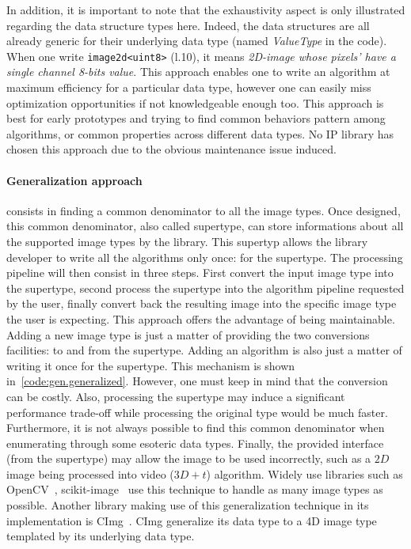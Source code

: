 In addition, it is important to note that the exhaustivity aspect is only illustrated regarding the data structure types
here. Indeed, the data structures are all already generic for their underlying data type (named \emph{ValueType} in the
code). When one write \texttt{image2d<uint8>} (l.10), it means \emph{2D-image whose pixels' have a single channel 8-bits
  value}. This approach enables one to write an algorithm at maximum efficiency for a particular data type, however one
can easily miss optimization opportunities if not knowledgeable enough too. This approach is best for early prototypes
and trying to find common behaviors pattern among algorithms, or common properties across different data types. No IP
library has chosen this approach due to the obvious maintenance issue induced.

\paragraph{Generalization approach} consists in finding a common denominator to all the image types. Once designed, this
common denominator, also called supertype, can store informations about all the supported image types by the library.
This supertyp allows the library developer to write all the algorithms only once: for the supertype. The processing
pipeline will then consist in three steps. First convert the input image type into the supertype, second process the
supertype into the algorithm pipeline requested by the user, finally convert back the resulting image into the specific
image type the user is expecting. This approach offers the advantage of being maintainable. Adding a new image type is
just a matter of providing the two conversions facilities: to and from the supertype. Adding an algorithm is also just a
matter of writing it once for the supertype. This mechanism is shown in~\ref{code:gen.generalized}. However, one must
keep in mind that the conversion can be costly. Also, processing the supertype may induce a significant performance
trade-off while processing the original type would be much faster. Furthermore, it is not always possible to find this
common denominator when enumerating through some esoteric data types. Finally, the provided interface (from the
supertype) may allow the image to be used incorrectly, such as a $2D$ image being processed into video ($3D+t$)
algorithm. Widely use libraries such as OpenCV~\cite{bradski.2000.opencv}, scikit-image~\cite{vanderwalt.2014.skimage}
use this technique to handle as many image types as possible. Another library making use of this generalization
technique in its implementation is CImg~\cite{tschumperle.2012.cimg}. CImg generalize its data type to a 4D image type
templated by its underlying data type.

